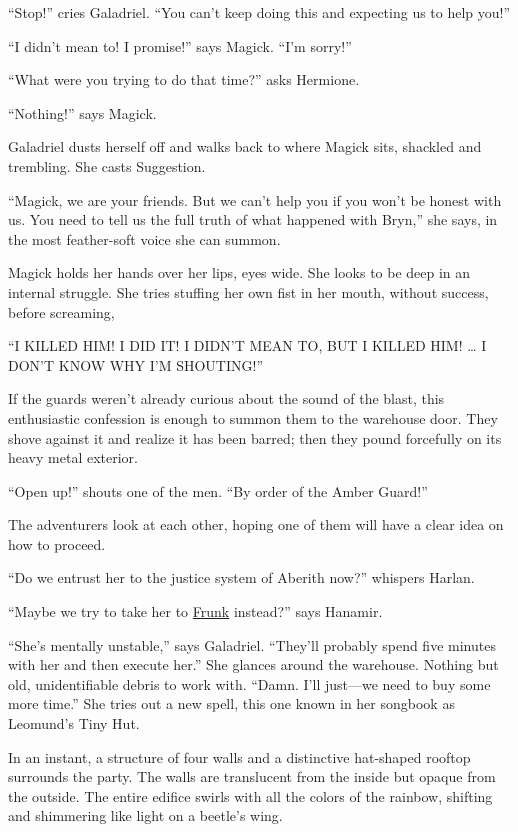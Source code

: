 \documentclass[smalldemyvopaper,11pt,twoside,onecolumn,openright,extrafontsizes]{memoir}
\begin{document}
``Stop!'' cries Galadriel. ``You can't keep doing this and expecting us
to help you!''

``I didn't mean to! I promise!'' says Magick. ``I'm sorry!''

``What were you trying to do that time?'' asks Hermione.

``Nothing!'' says Magick.

Galadriel dusts herself off and walks back to where Magick sits,
shackled and trembling. She casts Suggestion.

``Magick, we are your friends. But we can't help you if you won't be
honest with us. You need to tell us the full truth of what happened with
Bryn,'' she says, in the most feather-soft voice she can summon.

Magick holds her hands over her lips, eyes wide. She looks to be deep in
an internal struggle. She tries stuffing her own fist in her mouth,
without success, before screaming,

``I KILLED HIM! I DID IT! I DIDN'T MEAN TO, BUT I KILLED HIM! \ldots{} I
DON'T KNOW WHY I'M SHOUTING!''

If the guards weren't already curious about the sound of the blast, this
enthusiastic confession is enough to summon them to the warehouse door.
They shove against it and realize it has been barred; then they pound
forcefully on its heavy metal exterior.

``Open up!'' shouts one of the men. ``By order of the Amber Guard!''

The adventurers look at each other, hoping one of them will have a clear
idea on how to proceed.

``Do we entrust her to the justice system of Aberith now?'' whispers
Harlan.

``Maybe we try to take her to \href{/characters/frunk/}{Frunk}
instead?'' says Hanamir.

``She's mentally unstable,'' says Galadriel. ``They'll probably spend
five minutes with her and then execute her.'' She glances around the
warehouse. Nothing but old, unidentifiable debris to work with. ``Damn.
I'll just---we need to buy some more time.'' She tries out a new spell,
this one known in her songbook as Leomund's Tiny Hut.

In an instant, a structure of four walls and a distinctive hat-shaped
rooftop surrounds the party. The walls are translucent from the inside
but opaque from the outside. The entire edifice swirls with all the
colors of the rainbow, shifting and shimmering like light on a beetle's
wing.
\end{document}

